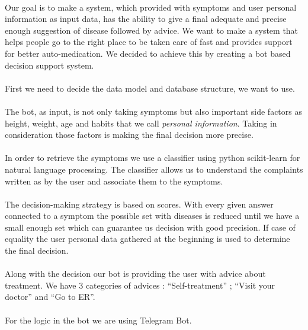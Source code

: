 	\paragraph{} 
	Our goal is to make a system, which provided with symptoms and user personal information as input data, has the ability to give a final adequate and precise enough suggestion of disease followed by advice. We want to make a system that helps people go to the right place to be taken care of fast and provides support for better auto-medication.
	We decided to achieve this by creating a bot based decision support system.
	\paragraph{}
	First we need to decide the data model and database structure, we want to use.
	\paragraph{}
	The bot, as input, is not only taking symptoms but also important side factors as height, weight, age and habits that we call \textit{personal information}. Taking in consideration those factors is making the final decision more precise. 
	\paragraph{}
	In order to retrieve the symptoms we use a classifier using python scikit-learn for natural language processing. The classifier allows us to understand the complaints written as by the user and associate them to the symptoms.
	\paragraph{}
	The decision-making strategy is based on scores. With every given answer connected to a symptom the possible set with diseases is reduced until we have a small enough set which can guarantee us decision with good precision. If case of equality the user personal data gathered at the beginning is used to determine the final decision. 
	\paragraph{}
	Along with the decision our bot is providing the user with advice about treatment. We have 3 categories of advices :
	“Self-treatment” ; “Visit your doctor” and “Go to ER”. 
	\paragraph{}
	For the logic in the bot we are using Telegram Bot. 
	
